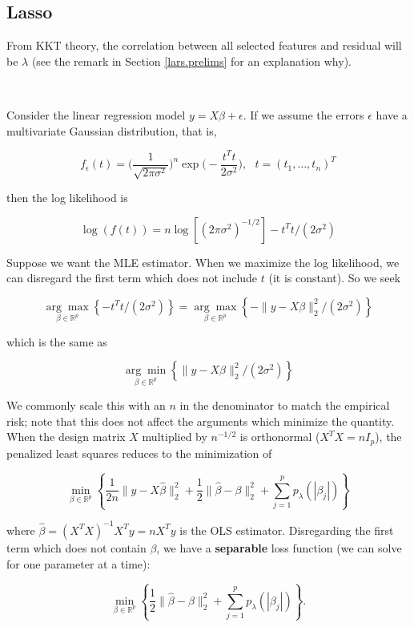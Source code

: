 \subsection{Lasso}

From KKT theory, the correlation between all selected features and residual will be \(\lambda\) (see the remark in Section \ref{lars.prelims} for an explanation why).

\

Consider the linear regression model \(y = X \beta + \epsilon\). If we assume the errors \(\epsilon\) have a multivariate Gaussian distribution, that is,

\[
f_\epsilon(t) = \bigg( \frac{1}{ \sqrt{2\pi \sigma^2}}   \bigg)^n \exp \bigg( - \frac{t^T t}{2 \sigma^2} \bigg) , \ \ \ t = (t_1, \ldots, t_n)^T
\]

then the log likelihood is

\[
\log(f(t)) = n \log[(2 \pi \sigma^2)^{-1/2}] - t^Tt/(2 \sigma^2)
\]

Suppose we want the MLE estimator. When we maximize the log likelihood, we can disregard the first term which does not include \(t\) (it is constant). So we seek

\[
\underset{\beta \in \mathbb{R}^p}{\arg \max} \left\{ -t^Tt/(2 \sigma^2) \right\} = \underset{\beta \in \mathbb{R}^p}{\arg \max}  \left\{- \lVert y - X \beta \rVert_2^2 /(2 \sigma^2) \right\}
\]

which is the same as

\[
\underset{\beta \in \mathbb{R}^p}{\arg \min} \left\{ \lVert y - X \beta \rVert_2^2 /(2 \sigma^2) \right\}
\]

We commonly scale this with an \(n\) in the denominator to match the empirical risk; note that this does not affect the arguments which minimize the quantity. When the design matrix \(X\) multiplied by \(n^{-1/2}\) is orthonormal (\(X^TX = nI_p\)), the penalized least squares reduces to the minimization of 

\[
\min_{\beta \in \mathbb{R}^p} \left\{ \frac{1}{2n} \lVert y - X \hat{\beta} \rVert_2^2 + \frac{1}{2} \lVert \hat{\beta} - \beta \rVert_2^2 + \sum_{j=1}^p p_\lambda ( | \beta_j|)    \right\}
\]

where \(\hat{\beta} = (X^TX)^{-1}X^Ty = nX^T y\) is the OLS estimator. Disregarding the first term which does not contain \(\beta\), we have a \textbf{separable} loss function (we can solve for one parameter at a time):

\[
\min_{\beta \in \mathbb{R}^p} \left\{  \frac{1}{2} \lVert \hat{\beta} - \beta \rVert_2^2 + \sum_{j=1}^p p_\lambda ( | \beta_j|)   \right\}.
\]

